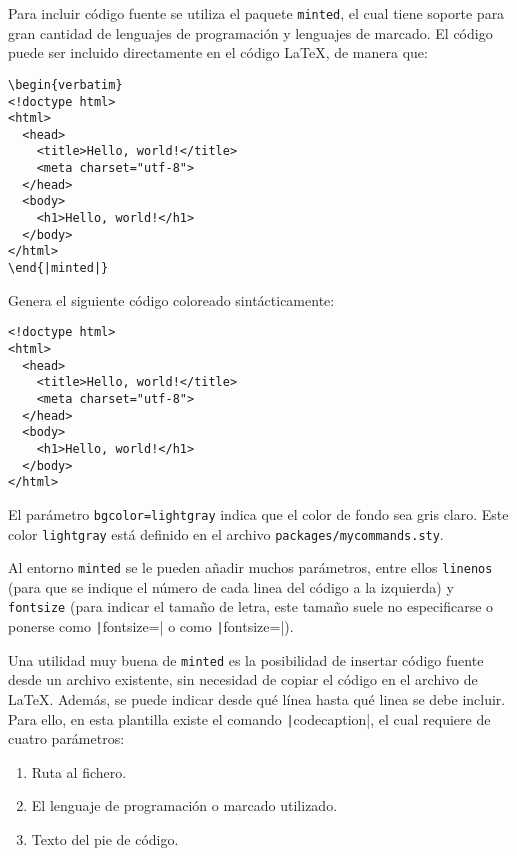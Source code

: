 \documentclass[../../main.tex]{subfile}
\begin{document}
  Para incluir código fuente se utiliza el paquete \texttt{minted}, el cual tiene soporte para gran cantidad de lenguajes de programación y lenguajes de marcado. El código puede ser incluido directamente en el código LaTeX, de manera que:

  \begin{verbatim}
\begin{verbatim}
<!doctype html>
<html>
  <head>
    <title>Hello, world!</title>
    <meta charset="utf-8">
  </head>
  <body>
    <h1>Hello, world!</h1>
  </body>
</html>
\end{|minted|}
  \end{verbatim}

  Genera el siguiente código coloreado sintácticamente:

  \begin{verbatim}
<!doctype html>
<html>
  <head>
    <title>Hello, world!</title>
    <meta charset="utf-8">
  </head>
  <body>
    <h1>Hello, world!</h1>
  </body>
</html>
  \end{verbatim}

  El parámetro \texttt{bgcolor=lightgray} indica que el color de fondo sea gris claro. Este color \texttt{lightgray} está definido en el archivo \texttt{packages/mycommands.sty}.

  Al entorno \texttt{minted} se le pueden añadir muchos parámetros, entre ellos \texttt{linenos} (para que se indique el número de cada linea del código a la izquierda) y \texttt{fontsize} (para indicar el tamaño de letra, este tamaño suele no especificarse o ponerse como \texttt|fontsize=\footnotesize| o como \texttt|fontsize=\scriptsize|).

  Una utilidad muy buena de \texttt{minted} es la posibilidad de insertar código fuente desde un archivo existente, sin necesidad de copiar el código en el archivo de LaTeX. Además, se puede indicar desde qué línea hasta qué linea se debe incluir. Para ello, en esta plantilla existe el comando \texttt|codecaption|, el cual requiere de cuatro parámetros:

  \begin{enumerate}
    \item Ruta al fichero.
    \item El lenguaje de programación o marcado utilizado.
    \item Texto del pie de código.
  \end{enumerate}
\end{document}
